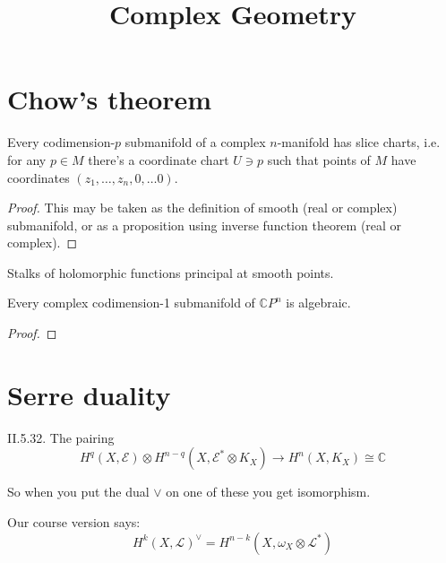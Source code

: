 



\title{Complex Geometry}
\maketitle

\label{section-phantom}

\tableofcontents

\section{Chow's theorem}
\label{section-chow-theorem}

\begin{proposition}
\label{proposition-slice-charts}
Every codimension-$p$ submanifold of a complex $n$-manifold has slice charts,
i.e. for any $p \in M$ there's a coordinate chart $U \ni p$ such that points of
$M$ have coordinates $(z_1,\ldots,z_n,0,\ldots 0)$.
\end{proposition}

\begin{proof}
This may be taken as the definition of smooth (real or complex) submanifold, or
as a proposition using inverse function theorem (real or complex).
\end{proof}

\begin{proposition}
\label{proposition-stalk-principal-smooth}
Stalks of holomorphic functions principal at smooth points.
\end{proposition}

\begin{theorem}
\label{theorem-chow}
Every complex codimension-1 submanifold of $\mathbb{C}P^{n}$ is algebraic.
\end{theorem}

\begin{proof}

\end{proof}

\section{Serre duality}
\label{section-serre-duality}

\begin{theorem} \label{theorem-serre-duality} \cite{voi}
II.5.32. The pairing
$$
H^q(X,\mathcal{E})\otimes
H^{n-q}(X,\mathcal{E}^*\otimes K_X)\to H^{n}(X,K_X)\cong\mathbb{C}
$$

\end{theorem}

So when you put the dual \(\vee\) on one of these you get isomorphism.

Our course version says:
$$
H^{k}(X,\mathcal{L})^{\vee}=H^{n-k}(X,\omega_X \otimes \mathcal{L}^*)
$$





